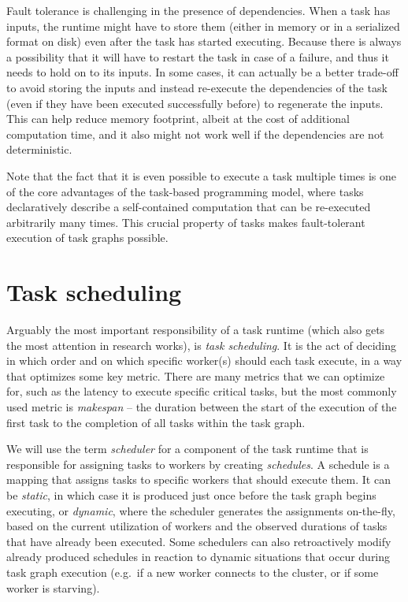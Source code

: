 Fault tolerance is challenging in the presence of dependencies. When a task has inputs, the runtime
might have to store them (either in memory or in a serialized format on disk) even after the task
has started executing. Because there is always a possibility that it will have to restart the task
in case of a failure, and thus it needs to hold on to its inputs. In some cases, it can actually be
a better trade-off to avoid storing the inputs and instead re-execute the dependencies of the task
(even if they have been executed successfully before) to regenerate the inputs. This can help
reduce memory footprint, albeit at the cost of additional computation time, and it also might not
work well if the dependencies are not deterministic.

Note that the fact that it is even possible to execute a task multiple times is one of the core
advantages of the task-based programming model, where tasks declaratively describe a self-contained
computation that can be re-executed arbitrarily many times. This crucial property of tasks makes
fault-tolerant execution of task graphs possible.

\section{Task scheduling}
Arguably the most important responsibility of a task runtime (which also gets the most attention in
research works), is \emph{task scheduling}. It is the act of deciding in which order and on which
specific worker(s) should each task execute, in a way that optimizes some key metric. There are
many metrics that we can optimize for, such as the latency to execute specific critical tasks, but
the most commonly used metric is \emph{makespan} -- the duration between the start of the
execution of the first task to the completion of all tasks within the task graph.

We will use the term \emph{scheduler} for a component of the task runtime that is responsible
for assigning tasks to workers by creating \emph{schedules}. A schedule is a mapping that
assigns tasks to specific workers that should execute them. It can be \emph{static}, in
which case it is produced just once before the task graph begins executing, or
\emph{dynamic}, where the scheduler generates the assignments on-the-fly, based on the
current utilization of workers and the observed durations of tasks that have already been executed.
Some schedulers can also retroactively modify already produced schedules in reaction to dynamic
situations that occur during task graph execution (e.g.\ if a new worker connects to the cluster,
or if some worker is starving).

